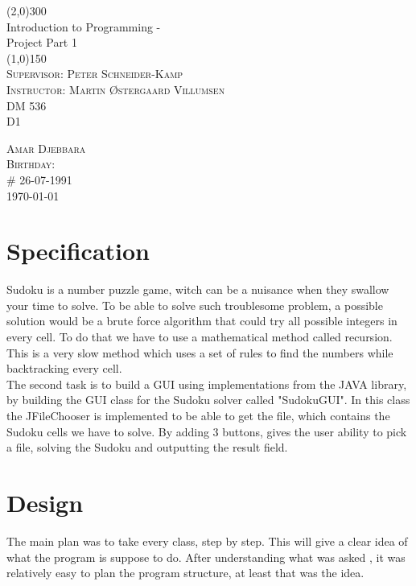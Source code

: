 \documentclass{article}
\begin{document}
 \begin{titlepage}
  \begin{center}
	\line(2,0){300}\\
	\huge{Introduction to Programming - \\ Project Part 1}\\
	\line(1,0){150}\\	
	\textsc{\large Supervisor: Peter Schneider-Kamp}\\
	\textsc{\large Instructor: Martin Østergaard Villumsen}\\	
	\textsc{\large DM 536}\\
	\textsc{\large D1}\\	
	[10cm] 
 \end{center}
 
\begin{flushright}
 \textsc{\normalsize Amar Djebbara\\
 Birthday:\\
 \# 26-07-1991\\
 \today}
\end{flushright}
\end{titlepage}


\tableofcontents

\newpage

\section{Specification}\label{sec:ass1}

Sudoku is a number puzzle game, witch can be a nuisance when they swallow your time to solve. To be able to solve such troublesome problem, a possible solution would be a brute force algorithm that could try all possible integers in every cell. To do that we have to use a mathematical method called recursion. This is a very slow method which uses a set of rules to find the numbers while backtracking every cell. \\

   
The second task is to build a GUI using implementations from the JAVA library, by building the GUI class for the Sudoku solver called "SudokuGUI". In this class the JFileChooser is implemented to be able to get the file, which contains the Sudoku cells we have to solve. By adding 3 buttons, gives the user ability to pick a file, solving the Sudoku and outputting the result field.\\


\section{Design}\label{sec:ass2}
The main plan was to take every class, step by step. This will give a clear idea of what the program is suppose to do. After understanding what was asked , it was relatively easy to plan the program structure, at least that was the idea.
\end{document}

